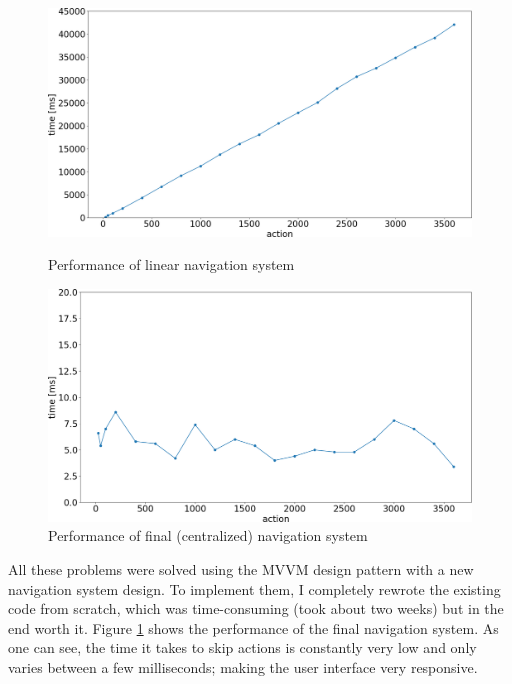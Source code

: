 \begin{figure}[!hbt]
\centering
\includegraphics[width=\textwidth]{figures/pyplot/performance_navsystem-linear.png}
\caption{Performance of linear navigation system}
\label{fig:navsystem.performance.linear}
\centering
\includegraphics[width=\textwidth]{figures/pyplot/performance_navsystem-central.png}
\caption{Performance of final (centralized) navigation system}
\label{fig:navsystem.performance.central}
\end{figure}

All these problems were solved using the MVVM design pattern with a new navigation system design. To implement them, I completely rewrote the existing code from scratch, which was time-consuming (took about two weeks) but in the end worth it. Figure \ref{fig:navsystem.performance.central} shows the performance of the final navigation system. As one can see, the time it takes to skip actions is constantly very low and only varies between a few milliseconds; making the user interface very responsive.

